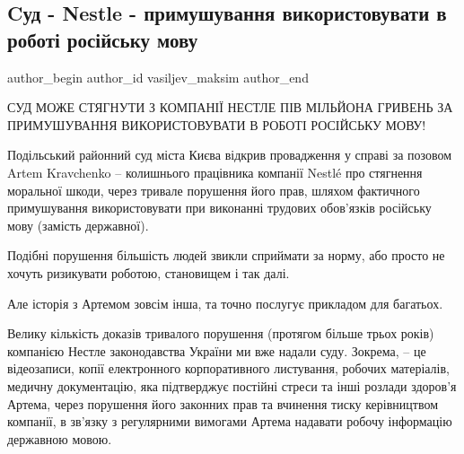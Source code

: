  
 
 
 
 
 
\subsection{Cуд - Nestle - примушування використовувати в роботі російську мову}
\label{sec:09_09_2021.fb.vasiljev_maksim.1.sud_nestle_jazyk_rabota}
 
\ifcmt
 author_begin
   author_id vasiljev_maksim
 author_end
\fi

СУД МОЖЕ СТЯГНУТИ З КОМПАНІЇ НЕСТЛЕ ПІВ МІЛЬЙОНА ГРИВЕНЬ ЗА ПРИМУШУВАННЯ
ВИКОРИСТОВУВАТИ В РОБОТІ РОСІЙСЬКУ МОВУ!

Подільський районний суд міста Києва відкрив провадження у справі за позовом
Artem Kravchenko – колишнього працівника компанії Nestlé про стягнення
моральної шкоди, через тривале порушення його прав, шляхом фактичного
примушування використовувати при виконанні трудових обов’язків російську мову
(замість державної).


Подібні порушення більшість людей звикли сприймати за норму, або просто не
хочуть ризикувати роботою, становищем і так далі.

Але історія з Артемом зовсім інша, та точно послугує прикладом для багатьох.

Велику кількість доказів тривалого порушення (протягом більше трьох років)
компанією Нестле законодавства України ми вже надали суду. Зокрема, –  це
відеозаписи, копії електронного корпоративного листування, робочих матеріалів,
медичну документацію, яка підтверджує постійні стреси та інші розлади здоров’я
Артема, через порушення його законних прав та вчинення тиску керівництвом
компанії, в зв’язку з регулярними вимогами Артема надавати робочу інформацію
державною мовою.

